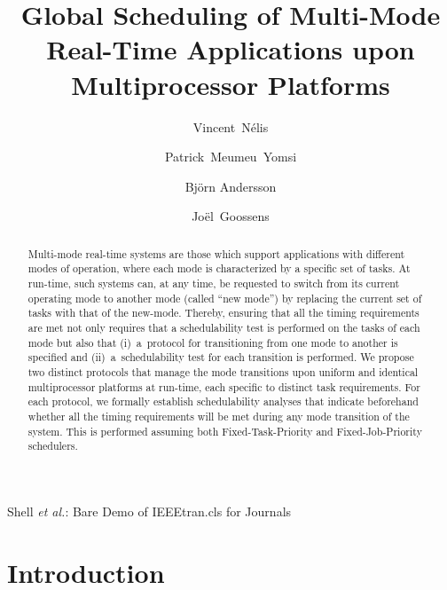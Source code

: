 \documentclass{article}
\newtheorem{validity test}{Validity Test}
\begin{document}
\title{Global Scheduling of Multi-Mode Real-Time Applications upon Multiprocessor Platforms}


\author{Vincent~N\'elis \and  Patrick~Meumeu~Yomsi \and
          Bj{\"{o}}rn Andersson
         \and
         Jo\"el~Goossens
        }





{Shell \MakeLowercase{\textit{et al.}}: Bare Demo of IEEEtran.cls for Journals}












\date{}

\maketitle


\begin{abstract}
\boldmath
Multi-mode real-time systems are those which support applications with different modes of operation, where each mode is characterized by a specific set of tasks. At run-time, such systems can, at any time, be requested to switch from its current operating mode to another mode (called ``new mode'') by replacing the current set of tasks with that of the new-mode. Thereby, ensuring that all the timing requirements are met not only requires that a schedulability test is performed on the tasks of each mode but also that \mbox{(i) a}~protocol for transitioning from one mode to another is specified and \mbox{(ii) a}~schedulability test for each transition is performed. We propose two distinct protocols that manage the mode transitions upon uniform and identical multiprocessor platforms at run-time, each specific to distinct task requirements. For each protocol, we formally establish schedulability analyses that indicate beforehand whether all the timing requirements will be met during any mode transition of the system. This is performed assuming both Fixed-Task-Priority and Fixed-Job-Priority schedulers. 
\end{abstract}




\section{Introduction}
\label{sec:Introduction} 
\end{document}
